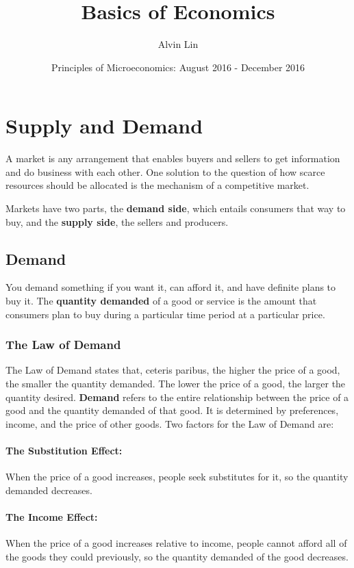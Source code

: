 \documentclass[letterpaper, 12pt]{article}
\title{Basics of Economics}
\author{Alvin Lin}
\date{Principles of Microeconomics: August 2016 - December 2016}
\begin{document}
\maketitle

\section{Supply and Demand}
A market is any arrangement that enables buyers and sellers to get information
and do business with each other. One solution to the question of how scarce
resources should be allocated is the mechanism of a competitive market. \par
Markets have two parts, the \textbf{demand side}, which entails consumers
that way to buy, and the \textbf{supply side}, the sellers and producers.

\subsection{Demand}
You demand something if you want it, can afford it, and have definite plans to
buy it. The \textbf{quantity demanded} of a good or service is the amount that
consumers plan to buy during a particular time period at a particular price.

\subsubsection{The Law of Demand}
The Law of Demand states that, ceteris paribus, the higher the price
of a good, the smaller the quantity demanded. The lower the price of a good,
the larger the quantity desired. \textbf{Demand} refers to the entire
relationship between the price of a good and the quantity demanded of that
good. It is determined by preferences, income, and the price of other goods.
Two  factors for the Law of Demand are:

\paragraph{The Substitution Effect:}
When the price of a good increases, people seek substitutes for it, so the
quantity demanded decreases.

\paragraph{The Income Effect:}
When the price of a good increases relative to income, people cannot afford all
of the goods they could previously, so the quantity demanded of the good
decreases.
\end{document}
